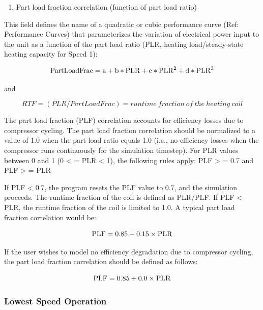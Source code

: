 \begin{enumerate}
\def\labelenumi{\arabic{enumi})}
\setcounter{enumi}{4}
\tightlist
\item
  Part load fraction correlation (function of part load ratio)
\end{enumerate}

This field defines the name of a quadratic or cubic performance curve (Ref: Performance Curves) that parameterizes the variation of electrical power input to the unit as a function of the part load ratio (PLR, heating load/steady-state heating capacity for Speed 1):

\begin{equation}
{\rm{PartLoadFrac}} = {\rm{a}} + {\rm{b*PLR}} + {\rm{c*PL}}{{\rm{R}}^2} + {\rm{d*PL}}{{\rm{R}}^3}
\end{equation}

and

\begin{equation}
RTF = (PLR/PartLoadFrac) = runtime~fraction~of~the~heating~coil
\end{equation}

The part load fraction (PLF) correlation accounts for efficiency losses due to compressor cycling. The part load fraction correlation should be normalized to a value of 1.0 when the part load ratio equals 1.0 (i.e., no efficiency losses when the compressor runs continuously for the simulation timestep). For PLR values between 0 and 1 (0 \textless{} = PLR \textless{} 1), the following rules apply:  PLF \textgreater{} = 0.7 and PLF \textgreater{} = PLR

If PLF \textless{} 0.7, the program resets the PLF value to 0.7, and the simulation proceeds. The runtime fraction of the coil is defined as PLR/PLF. If PLF \textless{} PLR, the runtime fraction of the coil is limited to 1.0. A typical part load fraction correlation would be:

\begin{equation}
{\rm{PLF}} = 0.85 + 0.15 \times {\rm{PLR}}
\end{equation}

If the user wishes to model no efficiency degradation due to compressor cycling, the part load fraction correlation should be defined as follows:

\begin{equation}
{\rm{PLF}} = 0.85 + 0.0 \times {\rm{PLR}}
\end{equation}

\subsubsection{Lowest Speed Operation}\label{lowest-speed-operation-201605050922}

